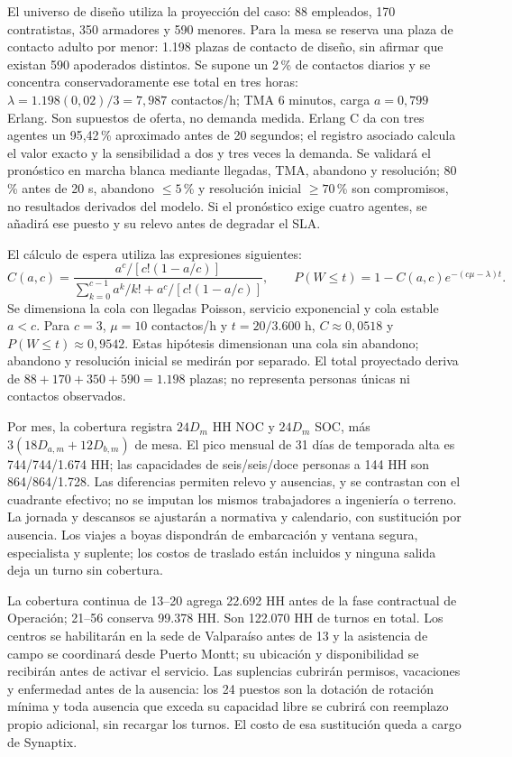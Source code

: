 El universo de diseño utiliza la proyección del caso: 88 empleados, 170 contratistas, 350 armadores y 590 menores. Para la mesa se reserva una plaza de contacto adulto por menor: 1.198 plazas de contacto de diseño, sin afirmar que existan 590 apoderados distintos. Se supone un 2\,\% de contactos diarios y se concentra conservadoramente ese total en tres horas: $\lambda=1.198(0,02)/3=7,987$ contactos/h; TMA 6 minutos, carga $a=0,799$ Erlang. Son supuestos de oferta, no demanda medida. Erlang C da con tres agentes un 95,42\,\% aproximado antes de 20 segundos; el registro asociado calcula el valor exacto y la sensibilidad a dos y tres veces la demanda. Se validará el pronóstico en marcha blanca mediante llegadas, TMA, abandono y resolución; 80\,\% antes de 20 s, abandono $\leq5$\,\% y resolución inicial $\geq70$\,\% son compromisos, no resultados derivados del modelo. Si el pronóstico exige cuatro agentes, se añadirá ese puesto y su relevo antes de degradar el SLA.~\parencite[RT-21.06/14; pp.~35--38]{bases-transversales}~\parencite[cap.~14, p.~31; cap.~15, RT-21.06, p.~36]{caso07}

El cálculo de espera utiliza las expresiones siguientes:
\[
C(a,c)=\frac{a^c/[c!(1-a/c)]}{\sum_{k=0}^{c-1}a^k/k!+a^c/[c!(1-a/c)]},
\qquad P(W\leq t)=1-C(a,c)e^{-(c\mu-\lambda)t}.
\]
Se dimensiona la cola con llegadas Poisson, servicio exponencial y cola estable $a<c$. Para $c=3$, $\mu=10$ contactos/h y $t=20/3.600$ h, $C\approx0,0518$ y $P(W\leq t)\approx0,9542$. Estas hipótesis dimensionan una cola sin abandono; abandono y resolución inicial se medirán por separado. El total proyectado deriva de $88+170+350+590=1.198$ plazas; no representa personas únicas ni contactos observados.

Por mes, la cobertura registra $24D_m$ HH NOC y $24D_m$ SOC, más $3(18D_{a,m}+12D_{b,m})$ de mesa. El pico mensual de 31 días de temporada alta es 744/744/1.674 HH; las capacidades de seis/seis/doce personas a 144 HH son 864/864/1.728. Las diferencias permiten relevo y ausencias, y se contrastan con el cuadrante efectivo; no se imputan los mismos trabajadores a ingeniería o terreno. La jornada y descansos se ajustarán a normativa y calendario, con sustitución por ausencia. Los viajes a boyas dispondrán de embarcación y ventana segura, especialista y suplente; los costos de traslado están incluidos y ninguna salida deja un turno sin cobertura.

La cobertura continua de 13--20 agrega 22.692 HH antes de la fase contractual de Operación; 21--56 conserva 99.378 HH. Son 122.070 HH de turnos en total. Los centros se habilitarán en la sede de Valparaíso antes de 13 y la asistencia de campo se coordinará desde Puerto Montt; su ubicación y disponibilidad se recibirán antes de activar el servicio. Las suplencias cubrirán permisos, vacaciones y enfermedad antes de la ausencia: los 24 puestos son la dotación de rotación mínima y toda ausencia que exceda su capacidad libre se cubrirá con reemplazo propio adicional, sin recargar los turnos. El costo de esa sustitución queda a cargo de Synaptix.~\parencite[RT-21.01/03/05/16; pp.~35--38]{bases-transversales}

